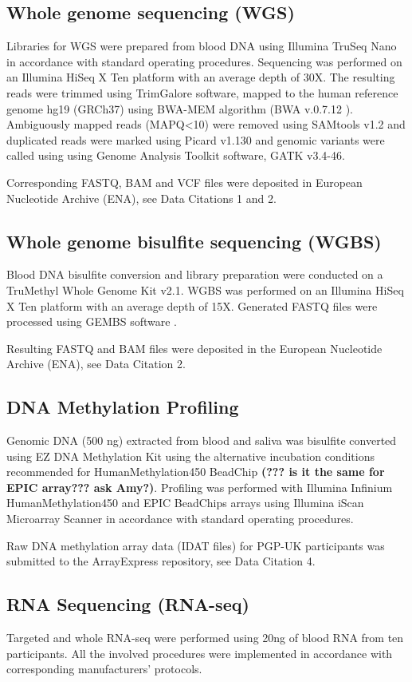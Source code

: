 \documentclass[english]{article}
\begin{document}
\subsection*{Whole genome sequencing (WGS)}
Libraries for WGS were prepared from blood DNA using Illumina TruSeq Nano in accordance with standard operating procedures. Sequencing was performed on an Illumina HiSeq X Ten platform with an average depth of 30X. The resulting reads were trimmed using TrimGalore software, mapped to the human reference genome hg19 (GRCh37) using BWA-MEM algorithm (BWA v.0.7.12 \cite{bwa_mem}). Ambiguously mapped reads (MAPQ<10) were removed using SAMtools v1.2 \cite{samtools} and duplicated reads were marked using Picard v1.130 and genomic variants were called using using Genome Analysis Toolkit software, GATK v3.4-46.

Corresponding FASTQ, BAM and VCF files were deposited in European Nucleotide Archive (ENA), see Data Citations 1 and 2.

\subsection*{Whole genome bisulfite sequencing (WGBS)}
Blood DNA bisulfite conversion and library preparation were conducted on a TruMethyl Whole Genome Kit v2.1. WGBS was performed on an Illumina HiSeq X Ten platform with an average depth of 15X. Generated FASTQ files were processed using GEMBS software \cite{gembs_bioinformatics}.

Resulting FASTQ and BAM files were deposited in the European Nucleotide Archive (ENA), see Data Citation 2.

\subsection*{DNA Methylation Profiling}
Genomic DNA (500 ng) extracted from blood and saliva was bisulfite converted using EZ DNA Methylation Kit using the alternative incubation conditions recommended for HumanMethylation450 BeadChip \textbf{(??? is it the same for EPIC array??? ask Amy?)}. Profiling was performed with Illumina Infinium HumanMethylation450 and EPIC BeadChips arrays using Illumina iScan Microarray Scanner in accordance with standard operating procedures.

Raw DNA methylation array data (IDAT files) for PGP-UK participants was submitted to the ArrayExpress repository, see Data Citation 4.

\subsection*{RNA Sequencing (RNA-seq)}
Targeted and whole RNA-seq were performed using 20ng of blood RNA from ten participants. All the involved procedures were implemented in accordance with corresponding manufacturers' protocols.
\end{document}
